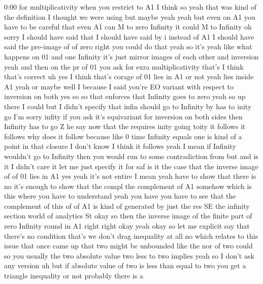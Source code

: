 \begin{unfinished}{0:00}
for  multiplicativity  when  you  restrict
to
A1
I  think
so  yeah  that  was  kind  of  the  definition
I  thought  we  were  using  but  maybe
yeah  yeah  but  even  on  A1  you  have  to  be
careful  that  even  A1  can  M  to  zero
Infinity  it  could  M  to  Infinity  oh  sorry
I  should  have  said  that  I  should  have
said  by  i  instead  of  A1  I  should  have
said  the  pre-image  of  of  zero  right  you
could  do  that  yeah  so  it's  yeah  like
what  happens  on  01  and  one  Infinity  it's
just  mirror  images  of  each  other  and
inversion  yeah  and  then  on  the  pr  of  01
you  ask  for  exra  multiplicativity
that's  I  think  that's  correct
uh  yes  I  think  that's  corage  of  01  lies
in  A1  or  not  yeah  lies  inside  A1  yeah  or
maybe  well  I  because  I  said  you're  EO
variant  with  respect  to  inversion  on
both  yes  so  so  that  enforces  that
Infinity  goes  to  zero  yeah  so  up  there  I
could  but  I  didn't  specify  that  infin
should  go  to  Infinity  by  has  to  inity  go
I'm  sorry
infity  if  you  ask  it's  equivariant  for
inversion  on  both  sides  then  Infinity
has  to  go  Z  he  say  now  that  the  requires
inity  going  toity  it  follows  it
follows  why  does  it  follow  because  like
0  time  Infinity  equals  one  is  kind  of  a
point  in  that  closure  I  don't  know  I
think  it
follows  yeah  I  mean  if  Infinity  wouldn't
go  to  Infinity  then  you  would  run  to
some  contradiction
from
but  and  is  it  I  didn't  care  it  let  me
just  specify  it  for
saf  is  it  the  case  that  the  inverse
image
of  of  01  lies  in  A1
yes  yeah  it's  not  entire  I
mean  yeah  have  to  show  that  there  is
no  it's  enough  to  show  that  the  compl
the  complement  of  A1  somehow  which  is
this  where  you  have  to  understand  yeah
you  have  you  have  to  see  that  the
complement  of  this  of  of  A1  is  kind  of
generated  by  just  the  res  SE  the
infinity  section  world  of  analytics  St
okay  so  then  the  inverse  image  of  the
finite  part  of  zero  Infinity  round  in  A1
right  right  okay
yeah  okay  so  let  me  explicit  say  that
there's  no
condition  that's  we  don't  drag
inequality  at  all  no  which  relates  to
this  issue  that  once  came  up  that  two
might  be  unbounded  like  the  nor  of  two
could  so  you  usually  the  two  absolute
value  two  less  to  two  implies  yeah  so  I
don't  ask  any
version
uh  but  if  absolute  value  of  two  is  less
than  equal  to  two  you  get  a  triangle
inequality  or  not  probably  there  is  a

\end{unfinished}

